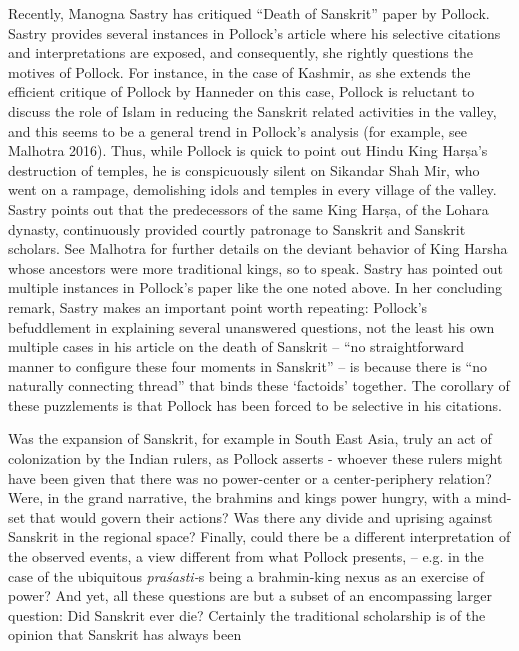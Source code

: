 Recently, Manogna Sastry has critiqued “Death of Sanskrit” paper by Pollock. Sastry provides several instances in Pollock’s article where his selective citations and interpretations are exposed, and consequently, she rightly questions the motives of Pollock. For instance, in the case of Kashmir, as she extends the efficient critique of Pollock by Hanneder on this case, Pollock is reluctant to discuss the role of Islam in reducing the Sanskrit related activities in the valley, and this seems to be a general trend in Pollock’s analysis (for example, see Malhotra 2016). Thus, while Pollock is quick to point out Hindu King Harṣa’s destruction of temples, he is conspicuously silent on Sikandar Shah Mir, who went on a rampage, demolishing idols and temples in every village of the valley. Sastry points out that the predecessors of the same King Harṣa, of the Lohara dynasty, continuously provided courtly patronage to Sanskrit and Sanskrit scholars. See Malhotra for further details on the deviant behavior of King Harsha whose ancestors were more traditional kings, so to speak. Sastry has pointed out multiple instances in Pollock’s paper like the one noted above. In her concluding remark, Sastry makes an important point worth repeating: Pollock’s befuddlement in explaining several unanswered questions, not the least his own multiple cases in his article on the death of Sanskrit – “no straightforward manner to configure these four moments in Sanskrit” – is because there is “no naturally connecting thread” that binds these ‘factoids’ together. The corollary of these puzzlements is that Pollock has been forced to be selective in his citations.

Was the expansion of Sanskrit, for example in South East Asia, truly an act of colonization by the Indian rulers, as Pollock asserts - whoever these rulers might have been given that there was no power-center or a center-periphery relation? Were, in the grand narrative, the brahmins and kings power hungry, with a mind-set that would govern their actions? Was there any divide and uprising against Sanskrit in the regional space? Finally, could there be a different interpretation of the observed events, a view different from what Pollock presents, – e.g. in the case of the ubiquitous \textit{praśasti-}s being a brahmin-king nexus as an exercise of power? And yet, all these questions are but a subset of an encompassing larger question: Did Sanskrit ever die? Certainly the traditional scholarship is of the opinion that Sanskrit has always \hbox{been}\break

